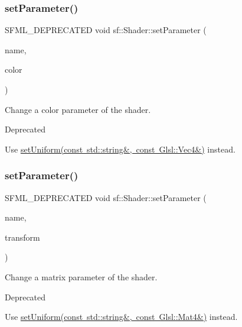 \subsubsection{\texorpdfstring{setParameter()}{setParameter()}\hspace{0.1cm}{\footnotesize\ttfamily [7/10]}}
{\footnotesize\ttfamily S\+F\+M\+L\+\_\+\+D\+E\+P\+R\+E\+C\+A\+T\+ED void sf\+::\+Shader\+::set\+Parameter (\begin{DoxyParamCaption}\item[{const std\+::string \&}]{name,  }\item[{const \mbox{\hyperlink{classsf_1_1_color}{Color}} \&}]{color }\end{DoxyParamCaption})}



Change a color parameter of the shader. 

\begin{DoxyRefDesc}{Deprecated}
\item[\mbox{\hyperlink{deprecated__deprecated000012}{Deprecated}}]Use \mbox{\hyperlink{classsf_1_1_shader_abc1aee8343800680fd62e1f3d43c24bf}{set\+Uniform(const std\+::string\&, const Glsl\+::\+Vec4\&)}} instead. \end{DoxyRefDesc}
\begin{DoxyVerb}\end{DoxyVerb}
 \mbox{\label{classsf_1_1_shader_a398a802fc5295ab69b0317892b0f0c75}} 
\subsubsection{\texorpdfstring{setParameter()}{setParameter()}\hspace{0.1cm}{\footnotesize\ttfamily [8/10]}}
{\footnotesize\ttfamily S\+F\+M\+L\+\_\+\+D\+E\+P\+R\+E\+C\+A\+T\+ED void sf\+::\+Shader\+::set\+Parameter (\begin{DoxyParamCaption}\item[{const std\+::string \&}]{name,  }\item[{const \mbox{\hyperlink{classsf_1_1_transform}{Transform}} \&}]{transform }\end{DoxyParamCaption})}



Change a matrix parameter of the shader. 

\begin{DoxyRefDesc}{Deprecated}
\item[\mbox{\hyperlink{deprecated__deprecated000013}{Deprecated}}]Use \mbox{\hyperlink{classsf_1_1_shader_aca5c55c4a3b23d21e33dbdaab7990755}{set\+Uniform(const std\+::string\&, const Glsl\+::\+Mat4\&)}} instead. \end{DoxyRefDesc}
\begin{DoxyVerb}\end{DoxyVerb}
 \mbox{\label{classsf_1_1_shader_a08c7cafd4f73ab898319c4fd7d8b5501}} 
